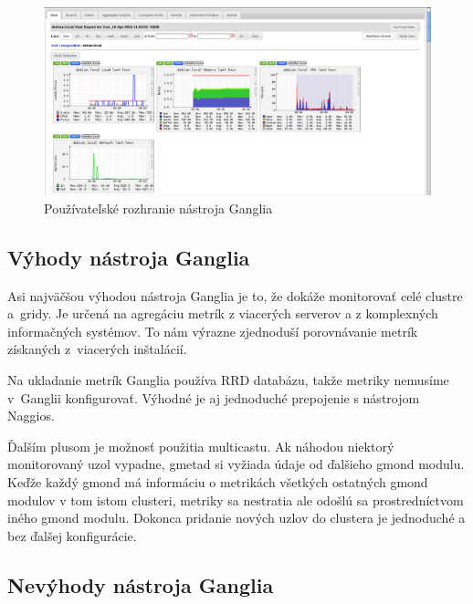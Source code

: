 \documentclass[a4paper, upjsfrontpage, disablespecwarning, thesismargins, thesislinespacing]{rnthesis}
\begin{document}
\begin{figure}
	\begin{center}
		\includegraphics[scale=0.41]{ganglia.png}
	\end{center}
	\caption{Používateľské rozhranie nástroja Ganglia}
\end{figure}

\subsection{Výhody nástroja Ganglia}

Asi najväčšou výhodou nástroja Ganglia je to, že dokáže monitorovať celé clustre a~gridy.
Je určená na agregáciu metrík z viacerých serverov a z komplexných informačných systémov.
To nám výrazne zjednoduší porovnávanie metrík získaných z~viacerých inštalácií.

Na ukladanie metrík Ganglia používa RRD databázu, takže metriky nemusíme v~Ganglii konfigurovať.
Výhodné je aj jednoduché prepojenie s nástrojom Naggios.

Ďalším plusom je možnosť použitia multicastu.
Ak náhodou niektorý monitorovaný uzol vypadne, gmetad si vyžiada údaje od ďalšieho gmond modulu.
Keďže každý gmond má informáciu o metrikách všetkých ostatných gmond modulov v tom istom clusteri,
metriky sa nestratia ale odošlú sa prostredníctvom iného gmond modulu. 
Dokonca pridanie nových uzlov do clustera je jednoduché a bez ďalšej konfigurácie.

\subsection{Nevýhody nástroja Ganglia}
\end{document}
